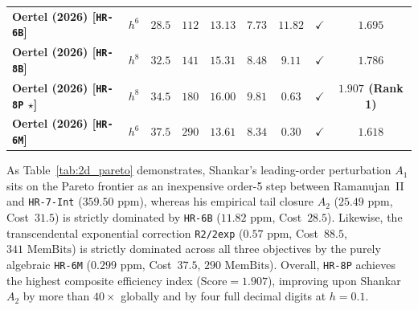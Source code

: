 \documentclass[11pt,a4paper]{article}
\theoremstyle{spacious}
\theoremstyle{spaciousdef}
\begin{document}
\begin{table}[H]
{\begin{tabular}{@{}lcccccccc@{}}
\textbf{Oertel (2026) [\texttt{HR-6B}]} & $h^6$ & $28.5$ & $112$ & $13.13$ & $7.73$ & $11.82$ & $\checkmark$ & $1.695$ \\
\textbf{Oertel (2026) [\texttt{HR-8B}]} & $h^8$ & $32.5$ & $141$ & $15.31$ & $8.48$ & $9.11$ & $\checkmark$ & $1.786$ \\
\textbf{Oertel (2026) [\texttt{HR-8P} $\star$]} & \textbf{$h^8$} & $34.5$ & $180$ & \textbf{$16.00$} & \textbf{$9.81$} & \textbf{$0.63$} & $\checkmark$ & \textbf{$1.907$ (Rank 1)} \\
\textbf{Oertel (2026) [\texttt{HR-6M}]} & $h^6$ & $37.5$ & $290$ & $13.61$ & $8.34$ & \textbf{$0.30$} & $\checkmark$ & $1.618$ \\
\bottomrule
\end{tabular}%
}
\end{table}

As Table~\ref{tab:2d_pareto} demonstrates, Shankar's leading-order perturbation $A_1$ sits on the Pareto frontier as an inexpensive order-5 step between Ramanujan~II and \texttt{HR-7-Int} ($359.50\text{ ppm}$), whereas his empirical tail closure $A_2$ ($25.49\text{ ppm}$, Cost~$31.5$) is strictly dominated by \texttt{HR-6B} ($11.82\text{ ppm}$, Cost~$28.5$). Likewise, the transcendental exponential correction \texttt{R2/2exp} ($0.57\text{ ppm}$, Cost~$88.5$, $341\text{ MemBits}$) is strictly dominated across all three objectives by the purely algebraic \texttt{HR-6M} ($0.299\text{ ppm}$, Cost~$37.5$, $290\text{ MemBits}$). Overall, \texttt{HR-8P} achieves the highest composite efficiency index ($\text{Score} = 1.907$), improving upon Shankar~$A_2$ by more than $40\times$ globally and by four full decimal digits at $h = 0.1$.
\end{document}
